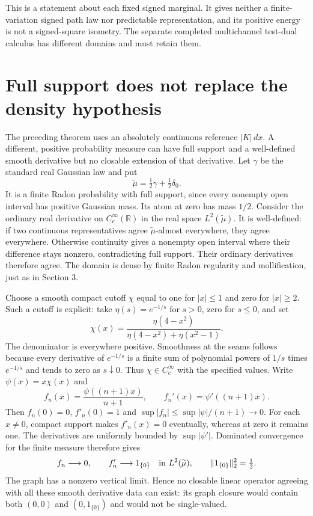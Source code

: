 \documentclass[11pt]{article}
\newcommand{\R}{\mathbb R}\newcommand{\C}{\mathbb C}
\begin{document}
This is a statement about each fixed signed marginal. It gives
neither a finite-variation signed path law nor predictable
representation, and its positive energy is not a signed-square
isometry. The separate completed multichannel test-dual calculus
has different domains and must retain them.


\section{Full support does not replace the density hypothesis}
The preceding theorem uses an absolutely continuous reference
$|K|\,dx$. A different, positive probability measure can have full
support and a well-defined smooth derivative but no closable
extension of that derivative. Let $\gamma$ be the standard real
Gaussian law and put
\[
 \widetilde\mu=\tfrac12\gamma+\tfrac12\delta_0.
\]
It is a finite Radon probability with full support, since every
nonempty open interval has positive Gaussian mass. Its atom at
zero has mass $1/2$. Consider the ordinary real derivative on
$C_c^\infty(\R)$ in the real space $L^2(\widetilde\mu)$.
It is well-defined: if two continuous representatives agree
$\widetilde\mu$-almost everywhere, they agree everywhere. Otherwise
continuity gives a nonempty open interval where their difference
stays nonzero, contradicting full support. Their ordinary
derivatives therefore agree. The domain is dense by finite Radon
regularity and mollification, just as in Section 3.

Choose a smooth compact cutoff $\chi$ equal to one for $|x|\leq1$
and zero for $|x|\geq2$. Such a cutoff is explicit: take
$\eta(s)=e^{-1/s}$ for $s>0$, zero for $s\leq0$, and set
\[
 \chi(x)=\frac{\eta(4-x^2)}{\eta(4-x^2)+\eta(x^2-1)}.
\]
The denominator is everywhere positive. Smoothness at the seams
follows because every derivative of $e^{-1/s}$ is a finite sum
of polynomial powers of $1/s$ times $e^{-1/s}$ and tends to
zero as $s\downarrow0$. Thus $\chi\in C_c^\infty$ with the
specified values. Write $\psi(x)=x\chi(x)$ and
\[
 f_n(x)=\frac{\psi((n+1)x)}{n+1},\qquad
 f_n'(x)=\psi'((n+1)x).
\]
Then $f_n(0)=0$, $f'_n(0)=1$ and
$\sup|f_n|\leq\sup|\psi|/(n+1)\to0$. For each $x\ne0$,
compact support makes $f'_n(x)=0$ eventually, whereas at zero
it remains one. The derivatives are uniformly bounded by
$\sup|\psi'|$. Dominated convergence for the finite measure
therefore gives
\begin{equation}\label{eq:atomicjetlimit}
 f_n\longrightarrow0,\qquad
 f_n'\longrightarrow 1_{\{0\}}
 \quad\hbox{in }L^2(\widetilde\mu),\qquad
 \|1_{\{0\}}\|_2^2=\tfrac12.
\end{equation}
The graph has a nonzero vertical limit. Hence no closable linear
operator agreeing with all these smooth derivative data can exist:
its graph closure would contain both $(0,0)$ and
$(0,1_{\{0\}})$ and would not be single-valued.
\end{document}
